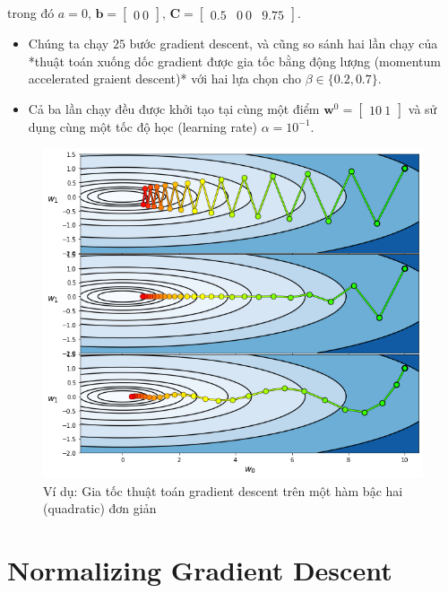 \documentclass{book}
\begin{document}
trong đó $a=0, \, \mathbf{b}=\begin{bmatrix} 0 \ 0 \end{bmatrix}, \, \mathbf{C} = \begin{bmatrix} 0.5 & 0 \ 0 & 9.75\end{bmatrix}$.
\begin{itemize}
    \item Chúng ta chạy $25$ bước gradient descent, và cũng so sánh hai lần chạy của *thuật toán xuống dốc gradient được gia tốc bằng động lượng (momentum accelerated graient descent)* với hai lựa chọn cho $\beta \in \{0.2, 0.7\}$.
    \item Cả ba lần chạy đều được khởi tạo tại cùng một điểm $\mathbf{w}^0 = \begin{bmatrix} 10 \ 1 \end{bmatrix}$ và sử dụng cùng một tốc độ học (learning rate) $\alpha = 10^{-1}$.
\end{itemize}
\begin{figure}[H]
    \centering
    \includegraphics[width=\textwidth]{images/eg_accelerating_gradient_descent_on_a_simple_quadratic.png}
    \caption{Ví dụ: Gia tốc thuật toán gradient descent trên một hàm bậc hai (quadratic) đơn giản}
    \label{fig:eg_accelerating_gradient_descent}
\end{figure}
\section{Normalizing Gradient Descent}
\end{document}
